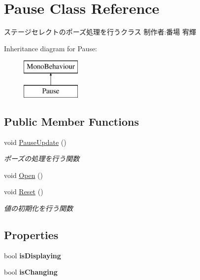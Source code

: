 \hypertarget{class_pause}{}\section{Pause Class Reference}
\label{class_pause}


ステージセレクトのポーズ処理を行うクラス 制作者\+:番場 宥輝  


Inheritance diagram for Pause\+:\begin{figure}[H]
\begin{center}
\leavevmode
\includegraphics[height=2.000000cm]{class_pause}
\end{center}
\end{figure}
\subsection*{Public Member Functions}
\begin{DoxyCompactItemize}
\item 
void \hyperlink{class_pause_a71b592c36b0dec43fd994e27eb324553}{Pause\+Update} ()
\begin{DoxyCompactList}\small\item\em ポーズの処理を行う関数 \end{DoxyCompactList}\item 
void \hyperlink{class_pause_ab516653ae42cf624b0fc448f1616ed10}{Open} ()
\item 
void \hyperlink{class_pause_a1bed2e1a05bef4f1d9fcaeba5b8bd2fe}{Reset} ()
\begin{DoxyCompactList}\small\item\em 値の初期化を行う関数 \end{DoxyCompactList}\end{DoxyCompactItemize}
\subsection*{Properties}
\begin{DoxyCompactItemize}
\item 
\mbox{\label{class_pause_aa2c440cb2264a9ed225e8ff48ab0b616}} 
bool {\bfseries is\+Displaying}
\item 
\mbox{\label{class_pause_a4149a10a956627fef2dbfca9e9720fb2}} 
bool {\bfseries is\+Changing}
\end{DoxyCompactItemize}
